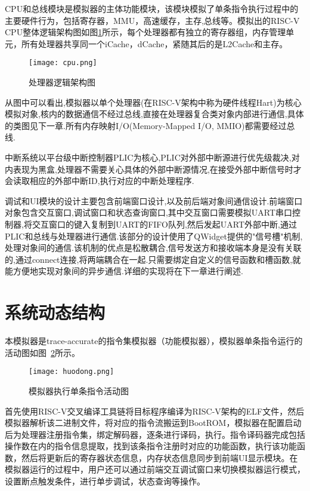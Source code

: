CPU和总线模块是模拟器的主体功能模块，该模块模拟了单条指令执行过程中的主要硬件行为，包括寄存器，MMU，高速缓存，主存,总线等。模拟出的RISC-V CPU整体逻辑架构图如图\ref{fig:cpu}所示，每个处理器都有独立的寄存器组，内存管理单元，所有处理器共享同一个iCache，dCache，紧随其后的是L2Cache和主存。
\begin{figure}[H]
  \centering
  \texttt{[image: cpu.png]}
  \caption{处理器逻辑架构图}
  \label{fig:cpu}
\end{figure}


从图中可以看出,模拟器以单个处理器(在RISC-V架构中称为硬件线程Hart)为核心模拟对象,核内的数据通信不经过总线,直接在处理器复合类对象内部进行通信,具体的类图见下一章.所有内存映射I/O(Memory-Mapped I/O, MMIO)都需要经过总线.


中断系统以平台级中断控制器PLIC为核心,PLIC对外部中断源进行优先级裁决,对内表现为黑盒,处理器不需要关心具体的外部中断源情况,在接受外部中断信号时才会读取相应的外部中断ID,执行对应的中断处理程序.


调试和UI模块的设计主要包含前端窗口设计,以及前后端对象间通信设计.前端窗口对象包含交互窗口,调试窗口和状态查询窗口,其中交互窗口需要模拟UART串口控制器,将交互窗口的键入复制到UART的FIFO队列,然后发起UART外部中断,通过PLIC和总线与处理器进行通信.该部分的设计使用了QWidget提供的"信号槽"机制,处理对象间的通信.该机制的优点是松散耦合,信号发送方和接收端本身是没有关联的,通过connect连接,将两端耦合在一起.只需要绑定自定义的信号函数和槽函数,就能方便地实现对象间的异步通信.详细的实现将在下一章进行阐述.

\clearpage
\section{系统动态结构}
本模拟器是trace-accurate的指令集模拟器（功能模拟器），模拟器单条指令运行的活动图如图~\ref{fig:sim-seq1}所示。
\begin{figure}[H]
  \centering
  \texttt{[image: huodong.png]}
  \caption{模拟器执行单条指令活动图}
  \label{fig:sim-seq1}
\end{figure}


首先使用RISC-V交叉编译工具链将目标程序编译为RISC-V架构的ELF文件，然后模拟器解析该二进制文件，将对应的指令流搬运到BootROM，模拟器在配置启动后为处理器注册指令集，绑定解码器，逐条进行译码，执行。指令译码器完成包括操作数在内的指令信息提取，找到该条指令注册时对应的功能函数，执行该功能函数，然后将更新后的寄存器状态信息，内存状态信息同步到前端UI显示模块。在模拟器运行的过程中，用户还可以通过前端交互调试窗口来切换模拟器运行模式，设置断点触发条件，进行单步调试，状态查询等操作。


